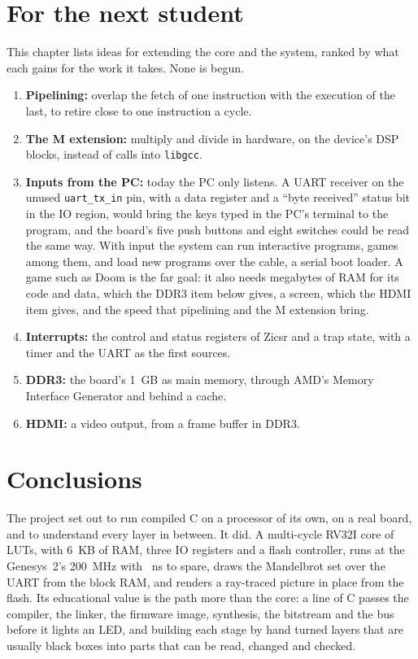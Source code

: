 \documentclass[11pt,a4paper]{report}
\begin{document}
\chapter{For the next student}
\label{ch:next}

This chapter lists ideas for extending the core and the system, ranked by what each gains for
the work it takes. None is begun.

\begin{enumerate}[leftmargin=*, itemsep=2pt]
  \item \textbf{Pipelining:} overlap the fetch of one instruction with the execution of the
    last, to retire close to one instruction a cycle.
  \item \textbf{The M extension:} multiply and divide in hardware, on the device's DSP blocks,
    instead of calls into \texttt{libgcc}.
  \item \textbf{Inputs from the PC:} today the PC only listens. A UART receiver on the unused
    \texttt{uart\_tx\_in} pin, with a data register and a ``byte received'' status bit in the
    IO region, would bring the keys typed in the PC's terminal to the program, and the board's
    five push buttons and eight switches could be read the same way. With input the system can
    run interactive programs, games among them, and load new programs over the cable, a serial
    boot loader. A game such as Doom is the far goal: it also needs megabytes of RAM for its
    code and data, which the DDR3 item below gives, a screen, which the HDMI item gives, and the
    speed that pipelining and the M extension bring.
  \item \textbf{Interrupts:} the control and status registers of Zicsr and a trap state, with a
    timer and the UART as the first sources.
  \item \textbf{DDR3:} the board's 1~GB as main memory, through AMD's Memory Interface
    Generator and behind a cache.
  \item \textbf{HDMI:} a video output, from a frame buffer in DDR3.
\end{enumerate}

\chapter{Conclusions}
\label{ch:concl}

The project set out to run compiled C on a processor of its own, on a real board, and to
understand every layer in between. It did. A multi-cycle RV32I core of \implLUTs{} LUTs,
with 6~KB of RAM, three IO registers and a flash controller, runs at the Genesys~2's
200~MHz with \implWNS~ns to spare, draws the Mandelbrot set over the UART from the block
RAM, and renders a ray-traced picture in place from the flash. Its educational value is the
path more than the core: a line of C passes the compiler, the linker, the firmware image,
synthesis, the bitstream and the bus before it lights an LED, and building each stage by hand
turned layers that are usually black boxes into parts that can be read, changed and checked.
\end{document}
